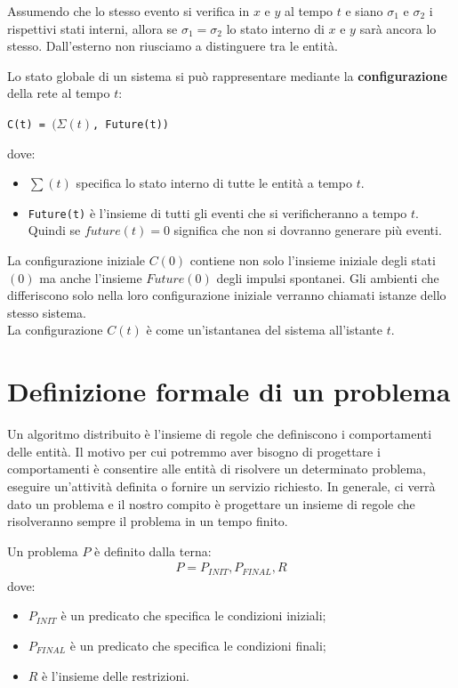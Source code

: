 \begin{prop}
    Assumendo che lo stesso evento si verifica in $x$ e $y$ al
    tempo $t$ e siano $\sigma_1$ e $\sigma_2$ i rispettivi stati interni, allora
    se $\sigma_1 = \sigma_2$ lo stato interno di $x$ e $y$ sarà ancora lo stesso.
    Dall'esterno non riusciamo a distinguere tra le entità.
\end{prop}

Lo stato globale di un sistema si può rappresentare mediante la
\textbf{configurazione} della rete al tempo $t$:

\begin{center}
    \texttt{C(t) = $(\Sigma(t)$, \texttt{Future(t)})}
\end{center}

dove:

\begin{itemize}
    \item $\sum(t)$ specifica lo stato interno di tutte le entità a tempo $t$.
    \item \texttt{Future(t)} è l'insieme di tutti gli eventi che si verificheranno
          a tempo $t$. Quindi se $future(t) = 0$ significa che non si dovranno generare
          più eventi.
\end{itemize}

La configurazione iniziale $C(0)$ contiene non solo l'insieme iniziale degli
stati $(0)$ ma anche l'insieme $Future(0)$ degli impulsi spontanei. Gli ambienti
che differiscono solo nella loro configurazione iniziale verranno chiamati
istanze dello stesso sistema.\\
La configurazione $C(t)$ è come un'istantanea del sistema all'istante $t$.


\section{Definizione formale di un problema}
Un algoritmo distribuito è l'insieme di regole che definiscono i comportamenti
delle entità. Il motivo per cui potremmo aver bisogno di progettare i
comportamenti è consentire alle entità di risolvere un determinato problema,
eseguire un'attività definita o fornire un servizio richiesto. In generale, ci
verrà dato un problema e il nostro compito è progettare un insieme di regole che
risolveranno sempre il problema in un tempo finito.

\begin{definition}
    Un problema $P$ è definito dalla terna:
    \begin{eqnarray}
        P = P_{INIT}, P_{FINAL}, R
        \nonumber
    \end{eqnarray}
    dove:
    \begin{itemize}
        \item $P_{INIT}$ è un predicato che specifica le condizioni iniziali;
        \item $P_{FINAL}$ è un predicato che specifica le condizioni finali;
        \item $R$ è l'insieme delle restrizioni. \end{itemize}
\end{definition}

